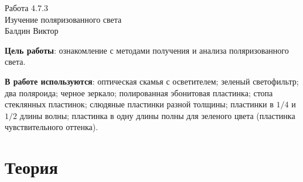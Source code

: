 
\usepackage{booktabs}
\usepackage{multirow}

\usepackage{wrapfig}



\begin{center}
  \LARGE{Работа 4.7.3}\\[0.2cm]
  \LARGE{Изучение поляризованного света}\\[0.2cm]
  \large{Балдин Виктор}\\[0.2cm]
\end{center}

\textbf{Цель работы}: ознакомление с методами получения и анализа поляризованного света.


\textbf{В работе используются}: оптическая скамья с осветителем; зеленый светофильтр; два поляроида; черное зеркало; полированная эбонитовая пластинка; стопа стеклянных пластинок; слюдяные пластинки разной толщины; пластинки в $1/4$ и $1/2$ длины волны; пластинка в одну длины полны для зеленого цвета (пластинка чувствительного оттенка).
\section*{Теория}

